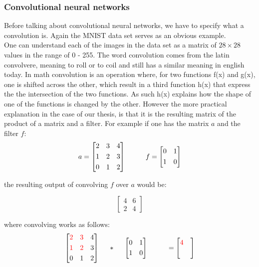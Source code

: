 \subsubsection{Convolutional neural networks}
Before talking about convolutional neural networks, we have to specify what a convolution is. Again the MNIST data set serves as an obvious example.\\
One can understand each of the images in the data set as a matrix of $28\times28$ values in the range of 0 - 255. The word convolution comes from the latin convolvere, meaning to roll or to coil and still has a similar meaning in english today. In math convolution is an operation where, for two functions f(x) and g(x), one is shifted across the other, which result in a third function h(x) that express the the intersection of the two functions. As such h(x) explains how the shape of one of the functions is changed by the other. 
However the more practical explanation in the case of our thesis, is that it is the resulting matrix of the product of a matrix and a filter. For example if one has the matrix $a$ and the filter $f$:
\[
a = \begin{bmatrix}
       2 & 3 & 4           \\[0.3em]
       1 & 2 & 3 \\[0.3em]
       0 & 1 & 2
     \end{bmatrix}
\hspace*{1cm}
f = \begin{bmatrix}
       0 & 1 \\[0.3em]
       1 & 0        
     \end{bmatrix}     
\]

the resulting output of convolving $f$ over $a$ would be:

\[
\begin{bmatrix}
       4 & 6 \\[0.3em]
       2 & 4        
     \end{bmatrix}     
\]

where convolving works as follows:
\[
\begin{bmatrix}
       \textcolor{red}2 & \textcolor{red}3 & 4           \\[0.3em]
       \textcolor{red}1 & \textcolor{red}2 & 3 \\[0.3em]
       0 & 1 & 2
     \end{bmatrix}
\hspace*{0.5cm}
*
\hspace*{0.5cm}
\begin{bmatrix}
       0 & 1 \\[0.3em]
       1 & 0        
     \end{bmatrix}     
\hspace*{1cm}
 = \begin{bmatrix}
       \textcolor{red}4 &  \\[0.3em]
         &         
     \end{bmatrix}
\]


